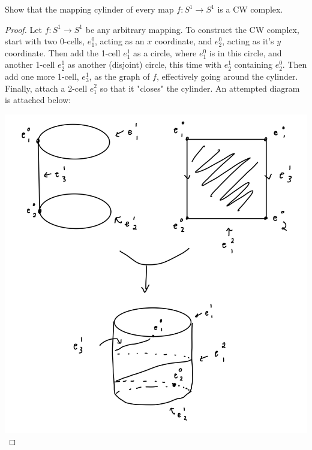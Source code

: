 \documentclass[12pt]{article}
\newenvironment{statement}[2][Statement]{\begin{trivlist}
\item[\hskip \labelsep {\bfseries #1}\hskip \labelsep {\bfseries #2.}]}{\end{trivlist}}
\begin{document}
\begin{statement}[Exercise]{0.17a}
    Show that the mapping cylinder of every map $f:S^1 \to S^1$ is a CW complex. 
\end{statement}
\begin{proof}
    Let $f:S^1 \to S^1$ be any arbitrary mapping. To construct the CW complex, start with two 0-cells, $e^0_1$, acting as an $x$ coordinate, and $e_2^0$, acting as it's $y$ coordinate. Then add the 1-cell $e^1_1$ as a circle, where $e^0_1$ is in this circle, and another 1-cell $e^1_2$ as another (disjoint) circle, this time with $e^1_2$ containing $e^0_2$. Then add one more 1-cell, $e^1_3$, as the graph of $f$, effectively going around the cylinder. Finally, attach a 2-cell $e^2_1$ so that it "closes" the cylinder. An attempted diagram is attached below:
    \par \includegraphics[scale=.3]{1.17.1.jpg}
\end{proof}
\end{document}
